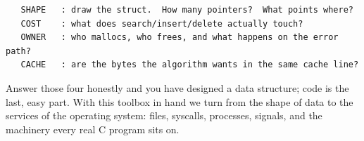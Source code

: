 \begin{verbatim}
   SHAPE   : draw the struct.  How many pointers?  What points where?
   COST    : what does search/insert/delete actually touch?
   OWNER   : who mallocs, who frees, and what happens on the error path?
   CACHE   : are the bytes the algorithm wants in the same cache line?
\end{verbatim}

Answer those four honestly and you have designed a data structure;
code is the last, easy part. With this toolbox in hand we turn from the
shape of data to the services of the operating system: files, syscalls,
processes, signals, and the machinery every real C program sits on.





